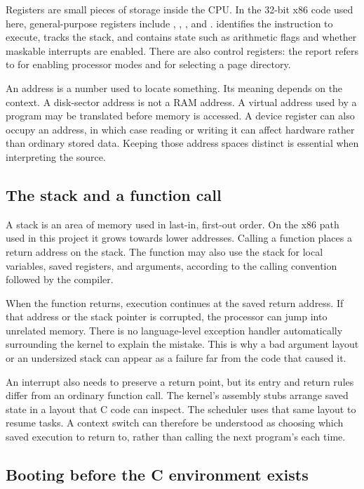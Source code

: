 \documentclass[11pt,a4paper]{scrartcl}
\newcommand{\code}[1]{\texttt{\detokenize{#1}}}
\begin{document}
Registers are small pieces of storage inside the CPU. In the 32-bit x86
code used here, general-purpose registers include \code{EAX}, \code{EBX},
\code{ECX}, and \code{EDX}. \code{EIP} identifies the instruction to
execute, \code{ESP} tracks the stack, and \code{EFLAGS} contains state such
as arithmetic flags and whether maskable interrupts are enabled. There
are also control registers: the report refers to \code{CR0} for enabling
processor modes and \code{CR3} for selecting a page directory.

An address is a number used to locate something. Its meaning depends on
the context. A disk-sector address is not a RAM address. A virtual address
used by a program may be translated before memory is accessed. A device
register can also occupy an address, in which case reading or writing it
can affect hardware rather than ordinary stored data. Keeping those
address spaces distinct is essential when interpreting the source.

\subsection{The stack and a function call}

A stack is an area of memory used in last-in, first-out order. On the x86
path used in this project it grows towards lower addresses. Calling a
function places a return address on the stack. The function may also use
the stack for local variables, saved registers, and arguments, according
to the calling convention followed by the compiler.

When the function returns, execution continues at the saved return
address. If that address or the stack pointer is corrupted, the processor
can jump into unrelated memory. There is no language-level exception
handler automatically surrounding the kernel to explain the mistake.
This is why a bad argument layout or an undersized stack can appear as a
failure far from the code that caused it.

An interrupt also needs to preserve a return point, but its entry and
return rules differ from an ordinary function call. The kernel's assembly
stubs arrange saved state in a layout that C code can inspect. The
scheduler uses that same layout to resume tasks. A context switch can
therefore be understood as choosing which saved execution to return to,
rather than calling the next program's \code{main} each time.

\subsection{Booting before the C environment exists}
\end{document}
